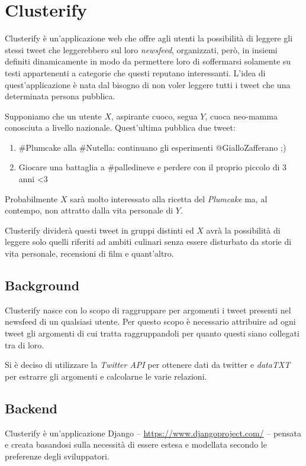 \chapter{Clusterify}
	Clusterify è un'applicazione web che offre agli utenti la possibilità di leggere gli stessi tweet che leggerebbero sul loro \emph{newsfeed}, organizzati, però, in insiemi definiti dinamicamente in modo da permettere loro di soffermarsi solamente su testi appartenenti a categorie che questi reputano interessanti. L'idea di quest'applicazione è nata dal bisogno di non voler leggere tutti i tweet che una determinata persona pubblica. 

	Supponiamo che un utente $X$, aspirante cuoco, segua $Y$, cuoca neo-mamma conosciuta a livello nazionale. Quest'ultima pubblica due tweet:
	\begin{enumerate}
		\item \#Plumcake alla \#Nutella: continuano gli esperimenti @GialloZafferano ;)
		\item Giocare una battaglia a \#palledineve e perdere con il proprio piccolo di 3 anni <3
	\end{enumerate}
	Probabilmente $X$ sarà molto interessato alla ricetta del \emph{Plumcake} ma, al contempo, non attratto dalla vita personale di $Y$.

	Clusterify dividerà questi tweet in gruppi distinti ed $X$ avrà la possibilità di leggere solo quelli riferiti ad ambiti culinari senza essere disturbato da storie di vita personale, recensioni di film e quant'altro.

\section{Background}
	Clusterify nasce con lo scopo di raggruppare per argomenti i tweet presenti nel newsfeed di un qualsiasi utente. Per questo scopo è necessario attribuire ad ogni tweet gli argomenti di cui tratta raggruppandoli per quanto questi siano collegati tra di loro. 

	Si è deciso di utilizzare la \emph{Twitter API} per ottenere dati da twitter e \emph{dataTXT} per estrarre gli argomenti e calcolarne le varie relazioni.

	
	

\section{Backend}
	Clusterify è un'applicazione Django -- \url{https://www.djangoproject.com/} -- pensata e creata basandosi sulla necessità di essere estesa e modellata secondo le preferenze degli sviluppatori. %


